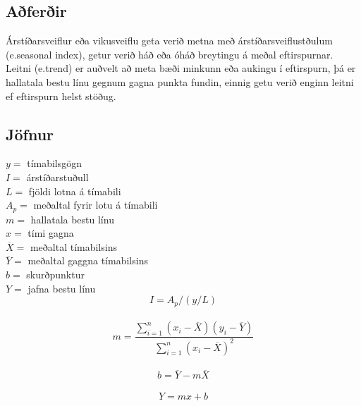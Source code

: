 \subsection{Aðferðir}
Árstíðarsveiflur eða vikusveiflu geta verið metna með árstíðarsveiflustðulum (e.seasonal index), getur verið háð eða óháð breytingu á meðal eftirspurnar. Leitni (e.trend) er auðvelt að meta bæði minkunn eða aukingu í eftirspurn, þá er hallatala bestu línu gegnum gagna punkta fundin, einnig getu verið enginn leitni ef eftirspurn helst stöðug.



	
\subsection{Jöfnur}

	$y=$ tímabilsgögn \\
	$I=$ árstíðarstuðull \\
	$L=$ fjöldi lotna á tímabili \\
	$A_p=$ meðaltal fyrir lotu á tímabili \\
	$m=$ hallatala bestu línu \\
	$x=$ tími gagna \\
	$\overline{X} = $ meðaltal tímabilsins \\
	$\overline{Y}= $ meðaltal gaggna tímabilsins \\
	$ b= $ skurðpunktur \\
	$ Y= $ jafna bestu línu \\

	$$ I=  A_p/(y/L) $$ \\
	$$ m= \frac{\sum_{i=1}^{n} (x_{i}-\overline{X})(y_{i}-\overline{Y})}{\sum_{i=1}^{n} (x_{i}-\overline{X})^{2}} $$ \\	
	$$ b=  \overline {Y} -m\overline{X} $$ \\
	$$ Y=  mx+b $$ \\

%
